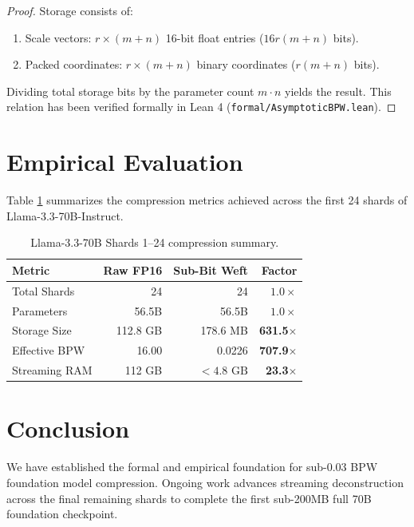 \documentclass[10pt,twocolumn,letterpaper]{article}
\begin{document}
\begin{proof}
Storage consists of:
\begin{enumerate}
    \item Scale vectors: $r \times (m + n)$ 16-bit float entries ($16r(m+n)$ bits).
    \item Packed coordinates: $r \times (m + n)$ binary coordinates ($r(m+n)$ bits).
\end{enumerate}
Dividing total storage bits by the parameter count $m \cdot n$ yields the result. This relation has been verified formally in Lean 4 (\texttt{formal/AsymptoticBPW.lean}).
\end{proof}

\section{Empirical Evaluation}
Table \ref{tab:results} summarizes the compression metrics achieved across the first 24 shards of Llama-3.3-70B-Instruct.

\begin{table}[h]
\centering
\small
\begin{tabular}{lrrr}
\toprule
\textbf{Metric} & \textbf{Raw FP16} & \textbf{Sub-Bit Weft} & \textbf{Factor} \\
\midrule
Total Shards & 24 & 24 & $1.0\times$ \\
Parameters & 56.5B & 56.5B & $1.0\times$ \\
Storage Size & 112.8 GB & 178.6 MB & \textbf{631.5$\times$} \\
Effective BPW & 16.00 & 0.0226 & \textbf{707.9$\times$} \\
Streaming RAM & 112 GB & $< 4.8\text{ GB}$ & \textbf{23.3$\times$} \\
\bottomrule
\end{tabular}
\caption{Llama-3.3-70B Shards 1--24 compression summary.}
\label{tab:results}
\end{table}

\section{Conclusion}
We have established the formal and empirical foundation for sub-0.03 BPW foundation model compression. Ongoing work advances streaming deconstruction across the final remaining shards to complete the first sub-200MB full 70B foundation checkpoint.
\end{document}
